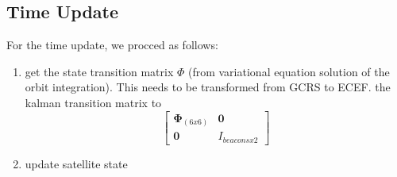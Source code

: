 \subsection{Time Update}
For the time update, we procced as follows:
\begin{enumerate}
  \item get the state transition matrix $\Phi$ (from variational equation solution of 
  the orbit integration). This needs to be transformed from GCRS to ECEF.
  \set the kalman transition matrix to 
  \begin{equation}
    \begin{bmatrix}
      \bm{\Phi}_{(6x6)} & \bm{0}  \\
      \bm{0} & I_{beacons x 2}
    \end{bmatrix}
  \end{equation}

  \item update satellite state
\end{enumerate}


\SetAlFnt{\footnotesize}

